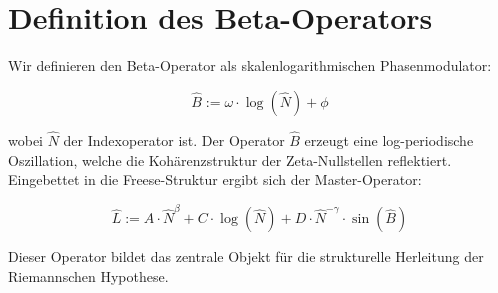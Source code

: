 \section{Definition des Beta-Operators}

Wir definieren den Beta-Operator als skalenlogarithmischen Phasenmodulator:

\[
\hat{B} := \omega \cdot \log(\hat{N}) + \phi
\]

wobei \( \hat{N} \) der Indexoperator ist. Der Operator \( \hat{B} \) erzeugt eine log-periodische Oszillation, welche die Kohärenzstruktur der Zeta-Nullstellen reflektiert. Eingebettet in die Freese-Struktur ergibt sich der Master-Operator:

\[
\hat{L} := A \cdot \hat{N}^\beta + C \cdot \log(\hat{N}) + D \cdot \hat{N}^{-\gamma} \cdot \sin(\hat{B})
\]

Dieser Operator bildet das zentrale Objekt für die strukturelle Herleitung der Riemannschen Hypothese.